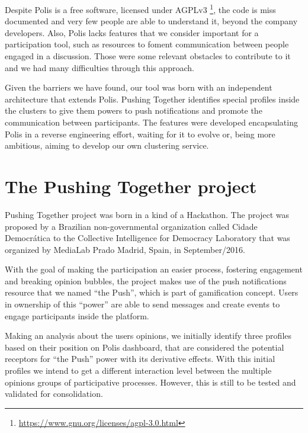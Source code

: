 \documentclass{llncs}
\begin{document}
  Despite Polis is a free software, licensed under
AGPLv3 \footnote{\url{https://www.gnu.org/licenses/agpl-3.0.html}},
the code is miss documented and
very few people are able to understand it, beyond the company developers. Also,
Polis lacks features that we consider important for a participation tool, such
as resources to foment communication between people engaged in a discussion. 
Those were some relevant obstacles to contribute to it and we had many 
difficulties through this approach.

Given the barriers we have found, our tool was born with an independent
architecture that extends Polis.
Pushing Together identifies special profiles inside the clusters to give them
powers to push notifications and promote the communication between participants.
The features were developed encapsulating Polis in a reverse engineering effort,
waiting for it to evolve or, being more ambitious, aiming to develop our own clustering service.

\section{The Pushing Together project}
\label{sec:pushingtogether}

  Pushing Together project was born in a kind of a Hackathon. The project was
proposed by a Brazilian non-governmental organization called Cidade Democr\'atica
to the Collective Intelligence for Democracy Laboratory that was organized by
MediaLab Prado Madrid, Spain, in September/2016.

  With the goal of making the participation an easier process, fostering
engagement and breaking opinion bubbles, the project makes use of the
push notifications resource that we named ``the Push'', which is part of gamification
concept. Users in ownership of this ``power'' are able to send
messages and create events to engage participants inside the platform.

 Making an analysis about the users opinions, we initially identify three
 profiles based on their position on Polis dashboard, that are considered the potential
 receptors for ``the Push'' power with its derivative effects. With this
 initial profiles we intend to get a different interaction level between
 the multiple opinions groups of participative processes. However, this is still
 to be tested and validated for consolidation.
\end{document}
